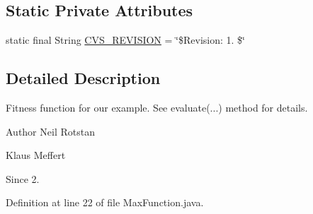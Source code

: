 \subsection*{Static Private Attributes}
\begin{DoxyCompactItemize}
\item 
static final String \hyperlink{classexamples_1_1simple_boolean_1_1_max_function_a648bd5b1591f4a6fbf1dea0577de220d}{C\-V\-S\-\_\-\-R\-E\-V\-I\-S\-I\-O\-N} = \char`\"{}\$Revision\-: 1. \$\char`\"{}
\end{DoxyCompactItemize}


\subsection{Detailed Description}
Fitness function for our example. See evaluate(...) method for details.

\begin{DoxyAuthor}{Author}
Neil Rotstan 

Klaus Meffert 
\end{DoxyAuthor}
\begin{DoxySince}{Since}
2. 
\end{DoxySince}


Definition at line 22 of file Max\-Function.\-java.



